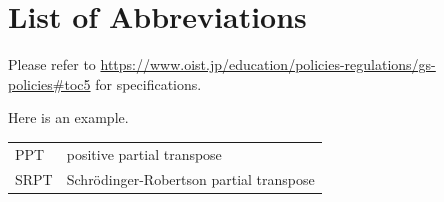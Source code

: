 \chapter*{List of Abbreviations}

Please refer to \url{https://www.oist.jp/education/policies-regulations/gs-policies#toc5} for specifications.

Here is an example.

\setlength\LTleft{-5pt} %

\begin{longtable}{l p{}}
    PPT  & positive partial transpose                \\
    SRPT & Schr\"odinger-Robertson partial transpose
\end{longtable}
